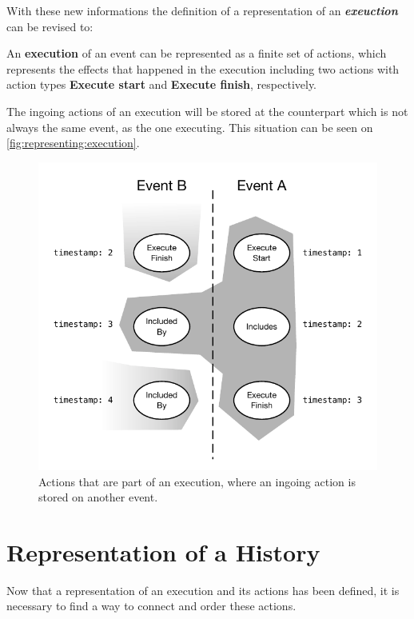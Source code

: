 	\noindent With these new informations the definition of a representation of an \textbf{\textit{exeuction}} can be revised to:
	
	\begin{definition}
		An \textbf{execution} of an event can be represented as a finite set of actions, which represents the effects that happened in the execution including two actions with action types \textbf{Execute start} and \textbf{Execute finish}, respectively.
		\label{def:execution}
	\end{definition}
	
    \noindent The ingoing actions of an execution will be stored at the counterpart which is not always the same event, as the one executing. This situation can be seen on \autoref{fig:representing:execution}.
    
    \begin{figure}[H]
		\centering
		\includegraphics[height=0.35\textheight]{3local/images/execution.pdf}
		\caption{Actions that are part of an execution, where an ingoing action is stored on another event.}
		\label{fig:representing:execution}
	\end{figure}

    \section{Representation of a History}\label{sec:rep:hist}
	Now that a representation of an execution and its actions has been defined, it is necessary to find a way to connect and order these actions.
    
